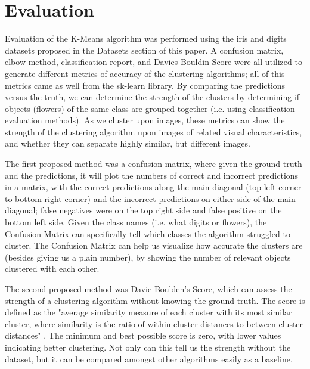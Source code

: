 \documentclass[10pt,twocolumn]{article}
\begin{document}
\section {Evaluation}

Evaluation of the K-Means algorithm was performed using the iris and digits datasets proposed in the Datasets section of this paper. A confusion matrix, elbow method, classification report, and Davies-Bouldin Score were all utilized to generate different metrics of accuracy of the clustering algorithms; all of this metrics came as well from the sk-learn library. By comparing the predictions versus the truth, we can determine the strength of the clusters by determining if objects (flowers) of the same class are grouped together (i.e. using classification evaluation methods). As we cluster upon images, these metrics can show the strength of the clustering algorithm upon images of related visual characteristics, and whether they can separate highly similar, but different images.

The first proposed method was a confusion matrix, where given the ground truth and the predictions, it will plot the numbers of correct and incorrect predictions in a matrix, with the correct predictions along the main diagonal (top left corner to bottom right corner) and the incorrect predictions on either side of the main diagonal; false negatives were on the top right side and false positive on the bottom left side. Given the class names (i.e. what digits or flowers), the Confusion Matrix can specifically tell which classes the algorithm struggled to cluster. The Confusion Matrix can help us visualize how accurate the clusters are (besides giving us a plain number), by showing the number of relevant objects clustered with each other. 

The second proposed method was Davie Boulden's Score, which can assess the strength of a clustering algorithm without knowing the ground truth. The score is defined as the "average similarity measure of each cluster with its most similar cluster, where similarity is the ratio of within-cluster distances to between-cluster distances" \cite{skLearn2020}. The minimum and best possible score is zero, with lower values indicating better clustering. Not only can this tell us the strength without the dataset, but it can be compared amongst other algorithms easily as a baseline.
\end{document}
